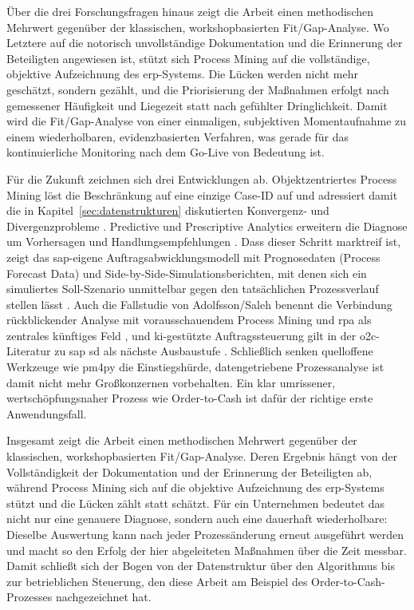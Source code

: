 Über die drei Forschungsfragen hinaus zeigt die Arbeit einen methodischen Mehrwert gegenüber der klassischen, workshopbasierten Fit/Gap-Analyse. Wo Letztere auf die notorisch unvollständige Dokumentation und die Erinnerung der Beteiligten angewiesen ist, stützt sich Process Mining auf die vollständige, objektive Aufzeichnung des \gls{erp}-Systems. Die Lücken werden nicht mehr geschätzt, sondern gezählt, und die Priorisierung der Maßnahmen erfolgt nach gemessener Häufigkeit und Liegezeit statt nach gefühlter Dringlichkeit. Damit wird die Fit/Gap-Analyse von einer einmaligen, subjektiven Momentaufnahme zu einem wiederholbaren, evidenzbasierten Verfahren, was gerade für das kontinuierliche Monitoring nach dem Go-Live von Bedeutung ist.

Für die Zukunft zeichnen sich drei Entwicklungen ab. Objektzentriertes Process Mining löst die Beschränkung auf eine einzige Case-ID auf und adressiert damit die in Kapitel~\ref{sec:datenstrukturen} diskutierten Konvergenz- und Divergenzprobleme \parencite[S.~3 ff.]{vanderaalst2019objectcentric}. Predictive und Prescriptive Analytics erweitern die Diagnose um Vorhersagen und Handlungsempfehlungen \parencite[Folie~470 f.]{coletta2026_1407}. Dass dieser Schritt marktreif ist, zeigt das \gls{sap}-eigene Auftragsabwicklungsmodell mit Prognosedaten (Process Forecast Data) und Side-by-Side-Simulationsberichten, mit denen sich ein simuliertes Soll-Szenario unmittelbar gegen den tatsächlichen Prozessverlauf stellen lässt \parencite[Abschnitt~3.1.16 und 3.4, S.~18 und 27--33]{sap2022samplecontent}. Auch die Fallstudie von Adolfsson/Saleh benennt die Verbindung rückblickender Analyse mit vorausschauendem Process Mining und \gls{rpa} als zentrales künftiges Feld \parencite[S.~73 f.]{adolfsson2026o2c}, und \gls{ki}-gestützte Auftragssteuerung gilt in der \gls{o2c}-Literatur zu \gls{sap} \gls{sd} als nächste Ausbaustufe \parencite[S.~111 f.]{nadukuru2024o2c}. Schließlich senken quelloffene Werkzeuge wie \gls{pm4py} die Einstiegshürde, datengetriebene Prozessanalyse ist damit nicht mehr Großkonzernen vorbehalten. Ein klar umrissener, wertschöpfungsnaher Prozess wie Order-to-Cash ist dafür der richtige erste Anwendungsfall.

Insgesamt zeigt die Arbeit einen methodischen Mehrwert gegenüber der klassischen, workshopbasierten Fit/Gap-Analyse. Deren Ergebnis hängt von der Vollständigkeit der Dokumentation und der Erinnerung der Beteiligten ab, während Process Mining sich auf die objektive Aufzeichnung des \gls{erp}-Systems stützt und die Lücken zählt statt schätzt. Für ein Unternehmen bedeutet das nicht nur eine genauere Diagnose, sondern auch eine dauerhaft wiederholbare: Dieselbe Auswertung kann nach jeder Prozessänderung erneut ausgeführt werden und macht so den Erfolg der hier abgeleiteten Maßnahmen über die Zeit messbar. Damit schließt sich der Bogen von der Datenstruktur über den Algorithmus bis zur betrieblichen Steuerung, den diese Arbeit am Beispiel des Order-to-Cash-Prozesses nachgezeichnet hat.

